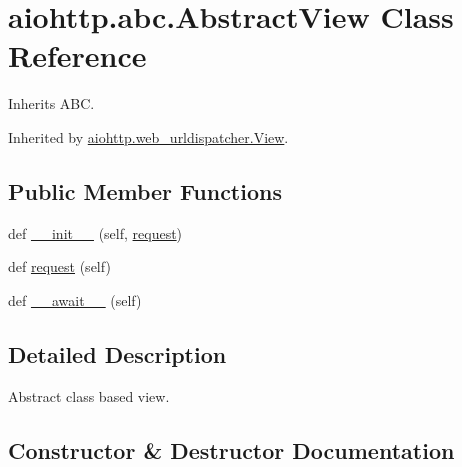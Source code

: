 \hypertarget{classaiohttp_1_1abc_1_1_abstract_view}{}\section{aiohttp.\+abc.\+Abstract\+View Class Reference}
\label{classaiohttp_1_1abc_1_1_abstract_view}


Inherits A\+BC.



Inherited by \hyperlink{classaiohttp_1_1web__urldispatcher_1_1_view}{aiohttp.\+web\+\_\+urldispatcher.\+View}.

\subsection*{Public Member Functions}
\begin{DoxyCompactItemize}
\item 
def \hyperlink{classaiohttp_1_1abc_1_1_abstract_view_aff799fa2252282bbead9db9d03bc153a}{\+\_\+\+\_\+init\+\_\+\+\_\+} (self, \hyperlink{classaiohttp_1_1abc_1_1_abstract_view_a2750f8b41cbe35442bd91c3824362e4e}{request})
\item 
def \hyperlink{classaiohttp_1_1abc_1_1_abstract_view_a2750f8b41cbe35442bd91c3824362e4e}{request} (self)
\item 
def \hyperlink{classaiohttp_1_1abc_1_1_abstract_view_ad770ab0cdd9b7518f96b0ee2073e0713}{\+\_\+\+\_\+await\+\_\+\+\_\+} (self)
\end{DoxyCompactItemize}


\subsection{Detailed Description}
\begin{DoxyVerb}Abstract class based view.\end{DoxyVerb}
 

\subsection{Constructor \& Destructor Documentation}
\mbox{\label{classaiohttp_1_1abc_1_1_abstract_view_aff799fa2252282bbead9db9d03bc153a}} 
